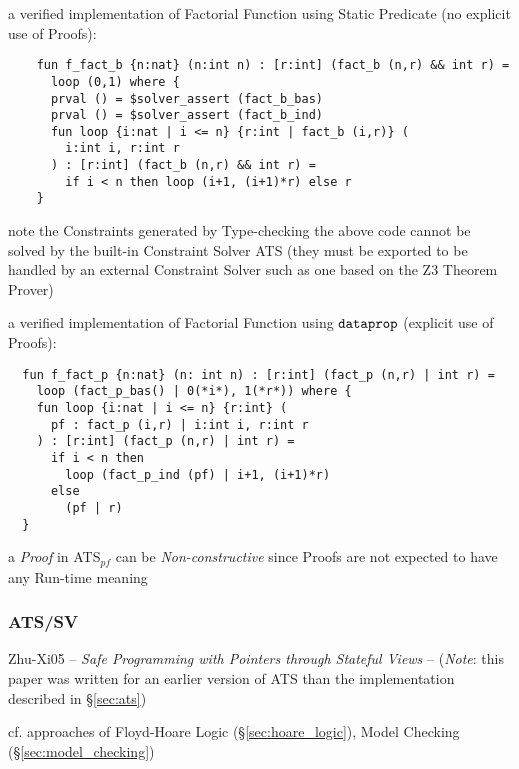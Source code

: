 a verified implementation of Factorial Function using Static Predicate
(no explicit use of Proofs):
\begin{verbatim}
    fun f_fact_b {n:nat} (n:int n) : [r:int] (fact_b (n,r) && int r) =
      loop (0,1) where {
      prval () = $solver_assert (fact_b_bas)
      prval () = $solver_assert (fact_b_ind)
      fun loop {i:nat | i <= n} {r:int | fact_b (i,r)} (
        i:int i, r:int r
      ) : [r:int] (fact_b (n,r) && int r) =
        if i < n then loop (i+1, (i+1)*r) else r
    }
\end{verbatim}

\fist note the Constraints generated by Type-checking the above code
cannot be solved by the built-in Constraint Solver ATS (they must be
exported to be handled by an external Constraint Solver such as one
based on the Z3 Theorem Prover) %

a verified implementation of Factorial Function using
$\mathtt{dataprop}$ (explicit use of Proofs):
\begin{verbatim}
  fun f_fact_p {n:nat} (n: int n) : [r:int] (fact_p (n,r) | int r) =
    loop (fact_p_bas() | 0(*i*), 1(*r*)) where {
    fun loop {i:nat | i <= n} {r:int} (
      pf : fact_p (i,r) | i:int i, r:int r
    ) : [r:int] (fact_p (n,r) | int r) =
      if i < n then
        loop (fact_p_ind (pf) | i+1, (i+1)*r)
      else
        (pf | r)
  }
\end{verbatim}

a \emph{Proof} in ATS$_{pf}$ can be \emph{Non-constructive} since
Proofs are not expected to have any Run-time meaning


\endgroup



\subsubsection{ATS/SV}\label{sec:ats_sv}

\begingroup

\newcommand{\addr}{\mathsf{addr}}
\newcommand{\ptr}{\mathbf{ptr}}
\newcommand{\bool}{\mathbf{bool}}
\newcommand{\intt}{\mathbf{intt}}
\renewcommand{\unit}{\mathbf{1}}

Zhu-Xi05 -- \emph{Safe Programming with Pointers through Stateful
  Views} -- (\emph{Note}: this paper was written for an earlier
version of ATS than the implementation described in \S\ref{sec:ats})

\fist cf. approaches of Floyd-Hoare Logic (\S\ref{sec:hoare_logic}),
Model Checking (\S\ref{sec:model_checking})

